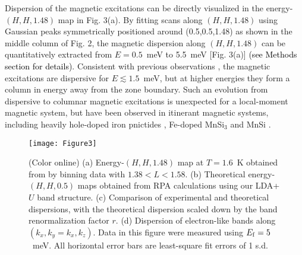 \documentclass[aps,prl,onecolumn,amsmath,amssymb,superscriptaddress]{revtex4}
\newcommand{\ys}{\textcolor{black}}
\begin{document}
Dispersion of the magnetic excitations can be directly visualized in the energy-$(H,H,1.48)$ map in Fig. 3(a).
By fitting scans along $(H,H,1.48)$ using Gaussian peaks symmetrically positioned around (0.5,0.5,1.48) as shown in the middle column of Fig. 2, the magnetic dispersion along $(H,H,1.48)$ can be quantitatively extracted from $E=0.5$~meV to 5.5~meV [Fig. 3(a)] \ys{(see Methods section for details)}. Consistent with previous observations \cite{OStockert2011,JArndt2011,ZHuesges2018}, the magnetic excitations are dispersive for $E\lesssim1.5$~meV, but at higher energies they form a column in energy away from the zone boundary. Such an evolution from dispersive to columnar magnetic excitations is unexpected for a local-moment magnetic system, but have been observed in itinerant magnetic systems, including heavily hole-doped iron pnictides \cite{KHorigane2016}, Fe-doped MnSi$_3$ \cite{STomiyoshi1987} and MnSi \cite{XChen2019}. 

\begin{figure}[t]
	\texttt{[image: Figure3]}
	\caption{ 
		(Color online) (a) Energy-$(H,H,1.48)$ map at $T=1.6$~K obtained from by binning data with $1.38<L<1.58$. (b) Theoretical energy-$(H,H,0.5)$ maps obtained from RPA calculations using our LDA+$U$ band structure. (c) Comparison of experimental and theoretical dispersions, with the theoretical dispersion scaled down by the band renormalization factor $r$. (d) Dispersion of electron-like bands along $(k_x,k_y=k_x,k_z)$. Data in this figure were measured using $E_{\rm f}=5$~meV. All horizontal error bars are least-square fit errors of 1 s.d.
	}
\end{figure}
\end{document}
